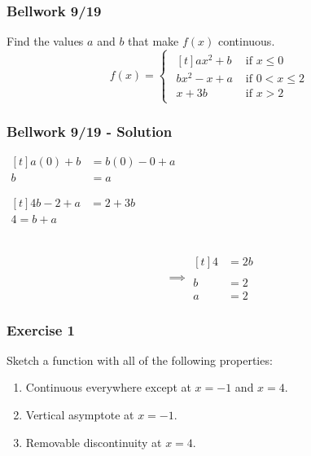 \documentclass[12pt]{beamer}
\begin{document}
\begin{frame}
	\frametitle{Bellwork 9/19}
	\initclock
	\vfill
	\vfill
	\vfill
	\Large
	Find the values $a$ and $b$ that make $f(x)$ continuous.
	\[
		f(x)=\begin{cases}
			\begin{aligned}[t]
				ax^2 + b     & \text{ if } x \leq 0     \\
				bx^2 - x + a & \text{ if } 0 < x \leq 2 \\
				x + 3b       & \text{ if } x > 2
			\end{aligned}
		\end{cases}
	\]\par
	\vfill
	\vfill
	\vfill
	\vfill
	\small
	\crono
\end{frame}
\begin{frame}
	\frametitle{Bellwork 9/19 - Solution}

	\large
	\begin{minipage}{0.5\textwidth}
		\begin{center}
			$\begin{aligned}[t]
				a(0) + b & = b(0) - 0 + a \\
				b & = a
			\end{aligned}$
		\end{center}
	\end{minipage}%
	\begin{minipage}{0.5\textwidth}
		\begin{center}
			$\begin{aligned}[t]
				4b - 2 + a & = 2 + 3b\\
				4 = b + a
			\end{aligned}$
		\end{center}
	\end{minipage}\\
	\[
		\implies\begin{aligned}[t]
			4 & = 2b \\
			~\\
			b & = 2 \\
			a & = 2
		\end{aligned}
	\]
\end{frame}
\begin{frame}
	\frametitle{Exercise 1}
	\vfill
	\vfill
	\vfill
	\vfill
	Sketch a function with all of the following properties:\par
	\vfill
	\begin{enumerate}\itemsep2ex
		\item Continuous everywhere except at $x = -1$ and $x = 4$.
		\item Vertical asymptote at $x = -1$.
		\item Removable discontinuity at $x = 4$.
	\end{enumerate}
	\vfill
	\vfill
	\vfill
	\vfill
	\vfill
\end{frame}
\end{document}
